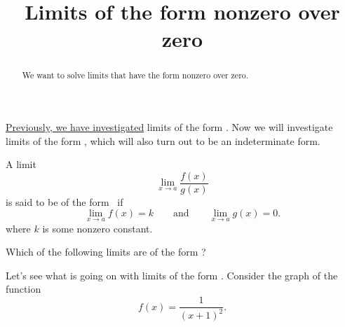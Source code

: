 \documentclass{ximera}
\title[Dig-In:]{Limits of the form nonzero over zero}
\begin{document}
\begin{abstract}
  We want to solve limits that have the form nonzero over zero.
\end{abstract}

\maketitle

\href{https://ximera.osu.edu/math160fa17/m160exam1content/indeterminateForms/digInLimitsOfTheFormZeroOverZero}{Previously, we have investigated} limits of the form \zeroOverZero.  Now we will investigate limits of the form \numOverZero, which will also turn out to be an indeterminate form. 
\begin{definition}
  A limit
  \[
  \lim_{x\to a} \frac{f(x)}{g(x)}
  \]
  is said to be of the form \numOverZero\ if
  \[
  \lim_{x\to a} f(x) = k\qquad\text{and}\qquad \lim_{x\to a} g(x) =0.
  \]
  where $k$ is some nonzero constant.
\end{definition}

\begin{problem}
  Which of the following limits are of the form \numOverZero?
  \begin{selectAll}
  \end{selectAll}
\end{problem}


Let's see what is going on with limits of the form \numOverZero.
Consider the graph of the function
  \[
  f(x) = \frac{1}{(x+1)^2}.
  \]
  
\begin{image}
  \end{image}
\end{document}
